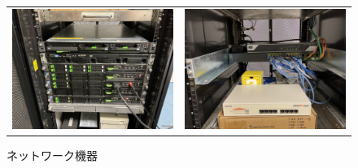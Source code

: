 \begin{figure}[H]
  \begin{tabular}{cc}
    \begin{minipage}[b]{0.40\columnwidth}
      \centering
      \includegraphics[width=\columnwidth]{./image/02-AboutSysken/server.jpg}
      \caption{ブレードサーバ}
    \end{minipage} &
    \hspace{0.04\columnwidth}
    \begin{minipage}[b]{0.40\columnwidth}
      \centering
      \includegraphics[width=\columnwidth]{./image/02-AboutSysken/network.jpg}
      \caption{ネットワーク機器}
    \end{minipage} \\

\end{tabular}
\end{figure}

